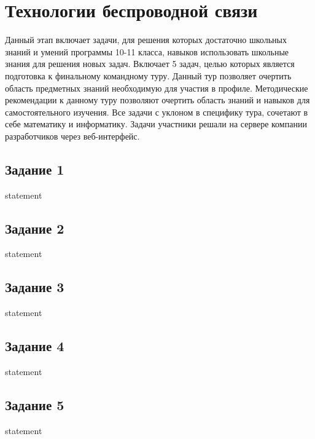 \chapter{Технологии беспроводной связи}

Данный этап включает задачи, для решения которых достаточно школьных знаний и умений программы 10-11 класса, навыков использовать школьные знания для решения новых задач. Включает 5 задач, целью которых является подготовка к финальному командному туру.  Данный тур позволяет очертить область предметных знаний необходимую для участия в профиле. Методические рекомендации к данному туру позволяют очертить область знаний и навыков для самостоятельного изучения. Все задачи с уклоном в специфику тура, сочетают в себе математику и информатику. Задачи участники решали на сервере компании разработчиков через веб-интерфейс.

\section{Задание 1}

{statement}

\section{Задание 2}

{statement}

\section{Задание 3}

{statement}

\section{Задание 4}

{statement}

\section{Задание 5}

{statement}